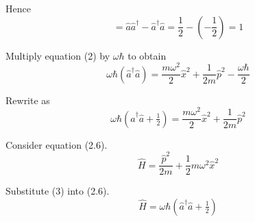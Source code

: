 \documentclass[12pt]{article}
\begin{document}
Hence
\begin{equation*}
[\hat a,\hat a^\dag]=\hat a\hat a^\dag-\hat a^\dag\hat a=\frac{1}{2}-\left(-\frac{1}{2}\right)=1
\end{equation*}

Multiply equation (2) by $\omega\hbar$ to obtain
\begin{equation*}
\omega\hbar\left(\hat a^\dag\hat a\right)=\frac{m\omega^2}{2}\hat x^2+\frac{1}{2m}\hat p^2-\frac{\omega\hbar}{2}
\end{equation*}

Rewrite as
\begin{equation*}
\omega\hbar\left(\hat a^\dag\hat a+\tfrac{1}{2}\right)
=\frac{m\omega^2}{2}\hat x^2+\frac{1}{2m}\hat p^2
\tag{3}
\end{equation*}

Consider equation (2.6).
\begin{equation*}
\hat H=\frac{\hat p^2}{2m}+\frac{1}{2}m\omega^2\hat x^2
\tag{2.6}
\end{equation*}

Substitute (3) into (2.6).
\begin{equation*}
\hat H=\omega\hbar\left(\hat a^\dag\hat a+\tfrac{1}{2}\right)
\end{equation*}
\end{document}
